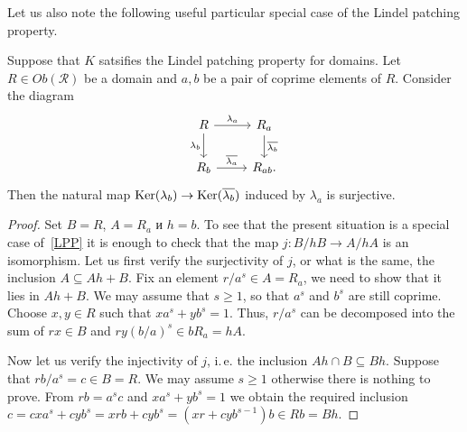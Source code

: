 \documentclass[oneside, 11pt]{amsart} \pdfoutput=1
\begin{document}
Let us also note the following useful particular special case of the Lindel patching property.
\begin{lemma}
	\label{zgl} Suppose that $K$ satsifies the Lindel patching property for domains. Let $R\in Ob(\mathcal{R})$ be a domain and $a, b$ be a pair of coprime elements of $R$. Consider the diagram
$$\begin{tikzcd}
	R \ar{r}{\lambda_a} \ar{d}[swap]{\lambda_b} & R_a \ar{d}{\overline{\lambda_b}}\\
	R_b \ar{r}{\overline{\lambda_a}} & R_{ab}.
\end{tikzcd}$$
	Then the natural map $\mathop{\mathrm{Ker}}\nolimits(\lambda_b) \to \mathop{\mathrm{Ker}}\nolimits(\overline{\lambda_b})$ induced by $\lambda_a$ is surjective.
\end{lemma}
\begin{proof}
	Set $B=R$, $A=R_a$ и $h=b$. To see that the present situation is a special case of~\ref{LPP} it is enough to  check that the map $j\colon B/hB \to A/hA$ is an isomorphism. Let us first verify the surjectivity of $j$, or what is the same, the inclusion $A \subseteq Ah+B$. Fix an element $r/a^s\in A=R_a$, we need to show that it lies in $Ah+B$. We may assume that $s\geq 1$, so that $a^s$ and $b^s$ are still coprime. Choose $x, y \in R$ such that $xa^s+yb^s=1$. Thus, $r/a^s$ can be decomposed into the sum of $rx\in B$ and $ry(b/a)^s\in bR_a=hA$.

	Now let us verify the injectivity of $j$, i.\,e. the inclusion $Ah\cap B \subseteq Bh$. Suppose that $rb/a^s=c\in B=R$. We may assume $s\geq 1$ otherwise there is nothing to prove. From $rb=a^sc$ and $xa^s+yb^s=1$ we obtain the required inclusion $c=cxa^s+cyb^s=xrb+cyb^s=(xr+cyb^{s-1})b \in Rb = Bh$. 
\end{proof}
\end{document}
